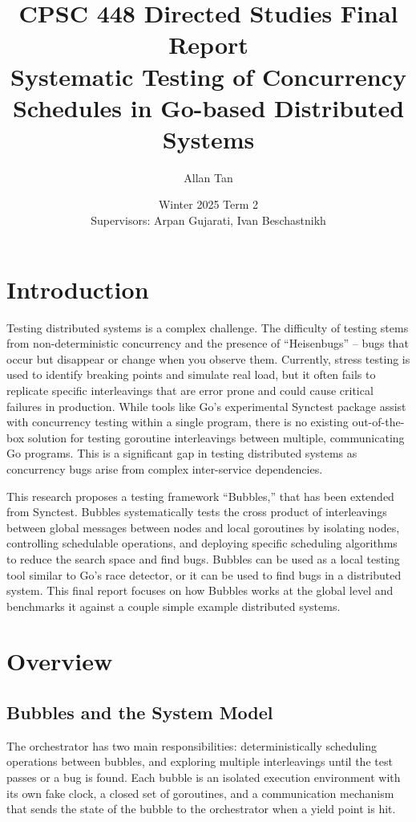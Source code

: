 \documentclass[11pt]{article}
\title{CPSC 448 Directed Studies Final Report\\Systematic Testing of Concurrency Schedules in Go-based Distributed Systems}
\author{Allan Tan}
\date{Winter 2025 Term 2\\Supervisors: Arpan Gujarati, Ivan Beschastnikh}
\begin{document}
\maketitle

\section{Introduction}

Testing distributed systems is a complex challenge. The difficulty of testing stems from non-deterministic concurrency and the presence of ``Heisenbugs'' -- bugs that occur but disappear or change when you observe them. Currently, stress testing is used to identify breaking points and simulate real load, but it often fails to replicate specific interleavings that are error prone and could cause critical failures in production. While tools like Go's experimental Synctest package assist with concurrency testing within a single program, there is no existing out-of-the-box solution for testing goroutine interleavings between multiple, communicating Go programs. This is a significant gap in testing distributed systems as concurrency bugs arise from complex inter-service dependencies.


This research proposes a testing framework ``Bubbles,'' that has been extended from Synctest. Bubbles systematically tests the cross product of interleavings between global messages between nodes and local goroutines by isolating nodes, controlling schedulable operations, and deploying specific scheduling algorithms to reduce the search space and find bugs. Bubbles can be used as a local testing tool similar to Go's race detector, or it can be used to find bugs in a distributed system. This final report focuses on how Bubbles works at the global level and benchmarks it against a couple simple example distributed systems.

\section{Overview}

\subsection{Bubbles and the System Model}

The orchestrator has two main responsibilities: deterministically scheduling operations between bubbles, and exploring multiple interleavings until the test passes or a bug is found. Each bubble is an isolated execution environment with its own fake clock, a closed set of goroutines, and a communication mechanism that sends the state of the bubble to the orchestrator when a yield point is hit.
\end{document}
